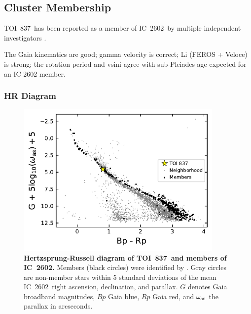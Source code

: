 \documentclass[12pt,twocolumn,tighten]{aastex62}
\newcommand{\tn}{TOI~837} %
\newcommand{\cn}{IC~2602} %
\begin{document}
\subsection{Cluster Membership}
\label{subsec:member}

\tn\ has been reported as a member of \cn\ by multiple independent 
investigators \citep{Kharchenko_et_al_2013,cantatgaudin_gaia_2018}.


The Gaia kinematics are good; gamma velocity is correct; Li (FEROS +
Veloce) is strong; the rotation period and vsini agree with
sub-Pleiades age expected for an IC 2602 member.

\subsubsection{HR Diagram}
\begin{figure}[t!]
	\begin{center}
		\leavevmode
		\includegraphics[width=0.9\textwidth]{f7.pdf}
	\end{center}
	\vspace{-0.7cm}
	\caption{ 
  {\bf Hertzsprung-Russell diagram of \tn\ and members of \cn.}
  Members (black circles) were identified by
  \citet{cantatgaudin_gaia_2018}.  Gray circles are non-member stars
  within 5 standard deviations of the mean \cn\ right ascension,
  declination, and parallax.  $G$ denotes Gaia broadband magnitudes,
  $Bp$ Gaia blue, $Rp$ Gaia red, and $\omega_{\rm as}$ the parallax in
  arcseconds. 
  \label{fig:hr}
	}
\end{figure}
\end{document}
